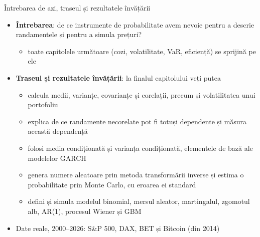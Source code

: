 \begin{frame}{Întrebarea de azi, traseul și rezultatele învățării}
\itemsize{\small}
\begin{itemize}
    \item \textbf{Întrebarea}: de ce instrumente de probabilitate avem nevoie pentru a descrie randamentele și pentru a simula prețuri?
    \begin{itemize}
        \item toate capitolele următoare (cozi, volatilitate, VaR, eficiență) se sprijină pe ele
    \end{itemize}
    \item \textbf{Traseul și rezultatele învățării}: la finalul capitolului veți putea
    \begin{itemize}
        \item calcula medii, varianțe, covarianțe și corelații, precum și volatilitatea unui portofoliu
        \item explica de ce randamente necorelate pot fi totuși dependente și măsura această dependență
        \item folosi media condiționată și varianța condiționată, elementele de bază ale modelelor GARCH
        \item genera numere aleatoare prin metoda transformării inverse și estima o probabilitate prin Monte Carlo, cu eroarea ei standard
        \item defini și simula modelul binomial, mersul aleator, martingalul, zgomotul alb, AR(1), procesul Wiener și GBM
    \end{itemize}
    \item Date reale, 2000--2026: S\&P 500, DAX, BET și Bitcoin (din 2014)
\end{itemize}
\end{frame}

